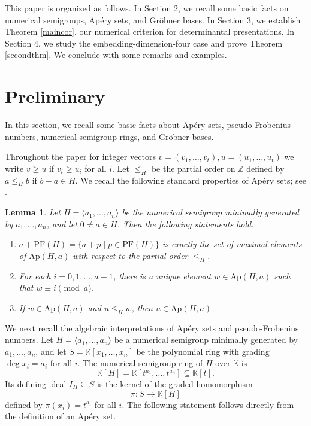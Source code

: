\documentclass[12pt]{amsart}
\numberwithin{equation}{section}
\newtheorem{lemma}[theorem]{Lemma}
\theoremstyle{definition}
\newcommand{\ZZ}{ \ensuremath{\mathbb{Z}}}
\newcommand{\PF}{\mathrm{PF}}
\newcommand{\F}{\mathbb{K}}
\newcommand{\Ap}{\mathrm{Ap}}
\begin{document}
This paper is organized as follows.
In Section 2, we recall some basic facts on numerical semigroups,
Ap\'ery sets, and Gr\"obner bases.
In Section 3, we establish Theorem \ref{maincor}, our numerical criterion
for determinantal presentations.
In Section 4, we study the embedding-dimension-four case and prove
Theorem \ref{secondthm}.
We conclude with some remarks and examples.




\section{Preliminary}

In this section, we recall some basic facts about Ap\'ery sets,
pseudo-Frobenius numbers, numerical semigroup rings, and Gr\"obner bases.

Throughout the paper for integer vectors $v=(v_1,\dots,v_t),u=(u_1,\dots,u_t)$
we write $v\geq u$ if $v_i \geq u_i$ for all $i$.
Let $\leq_H$ be the partial order on $\ZZ$ defined by
$a\leq_H b$ if $b-a\in H$.
We recall the following standard properties of Ap\'ery sets;
see \cite[Lemma 2.4 and Proposition 2.20]{RGS}.

\begin{lemma}
\label{aperibasic}
Let $H=\langle a_1,\dots,a_n\rangle$ be the numerical semigroup
minimally generated by $a_1,\dots,a_n$, and let $0\neq a\in H$.
Then the following statements hold.
\begin{enumerate}
    \item
    $a+\PF(H)=\{a+p\mid p\in\PF(H)\}$ is exactly the set of maximal
    elements of $\Ap(H,a)$ with respect to the partial order $\leq_H$.
    \item
    For each $i=0,1,\dots,a-1$, there is a unique element
    $w\in\Ap(H,a)$ such that $w\equiv i\pmod a$.
    \item
    If $w\in\Ap(H,a)$ and $u\leq_H w$, then $u\in\Ap(H,a)$.
\end{enumerate}
\end{lemma}

We next recall the algebraic interpretations of Ap\'ery sets and
pseudo-Frobenius numbers.
Let $H=\langle a_1,\dots,a_n\rangle$ be a numerical semigroup
minimally generated by $a_1,\dots,a_n$, and let
$S=\F[x_1,\dots,x_n]$ be the polynomial ring with grading
$\deg x_i=a_i$ for all $i$.
The numerical semigroup ring of $H$ over $\F$ is
\[
\F[H]=\F[t^{a_1},\dots,t^{a_n}]\subseteq\F[t].
\]
Its defining ideal $I_H\subseteq S$ is the kernel of the graded
homomorphism
\[
\pi:S\longrightarrow\F[H]
\]
defined by $\pi(x_i)=t^{a_i}$ for all $i$.
The following statement follows directly from the definition of an
Ap\'ery set.
\end{document}
